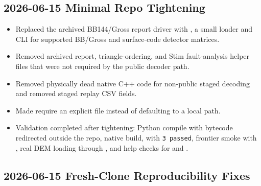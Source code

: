 \subsection*{2026-06-15 Minimal Repo Tightening}

\begin{itemize}
\item Replaced the archived BB144/Gross report driver with \texttt{}, a small loader and \texttt{} CLI for supported BB/Gross and surface-code detector matrices.
\item Removed archived report, triangle-ordering, and Stim fault-analysis helper files that were not required by the public decoder path.
\item Removed physically dead native C++ code for non-public staged decoding and removed staged replay CSV fields.
\item Made \texttt{} require an explicit \texttt{} file instead of defaulting to a local \texttt{} path.
\item Validation completed after tightening: Python compile with bytecode redirected outside the repo, native build, \texttt{} with \texttt{3 passed}, frontier smoke with \texttt{}, real \texttt{} DEM loading through \texttt{}, and help checks for \texttt{} and \texttt{}.
\end{itemize}

\subsection*{2026-06-15 Fresh-Clone Reproducibility Fixes}

